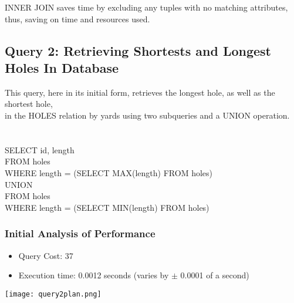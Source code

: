 \documentclass[titlepage]{article}
\begin{document}
\noindent
INNER JOIN saves time by excluding any tuples with no matching attributes, thus, saving on time and resources used.
\vspace{1em}
\subsection{Query 2: Retrieving Shortests and Longest Holes In Database}
\vspace{1em}
This query, here in its initial form, retrieves the longest hole, as well as the shortest hole, \\
in the HOLES relation by yards using two subqueries and a UNION operation.\\ \\ \\
\hspace{15pt}SELECT id, length \\
\hspace{15pt}FROM holes \\
\hspace{15pt}WHERE length = (SELECT MAX(length) FROM holes) \\
\hspace{15pt}UNION \\
\hspace{15pt}FROM holes \\
\hspace{15pt}WHERE length = (SELECT MIN(length) FROM holes) \\
\vspace{1em}
\subsubsection{Initial Analysis of Performance}
\vspace{1em}
\begin{itemize}
  \item Query Cost: 37
  \item Execution time: 0.0012 seconds (varies by $\pm$ 0.0001 of a second)
\end{itemize}
\vspace{1em}
\vspace{1em}
\begin{center}
  \texttt{[image: query2plan.png]}
\end{center}
\vspace{1em}
\end{document}
